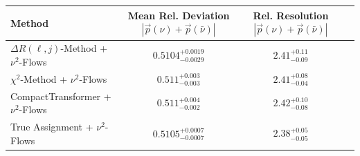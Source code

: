     \begin{tabular}{lccc}
        \toprule
        Method & Mean Rel. Deviation $|\vec{p}(\nu) + \vec{p}(\bar{\nu})|$ & Rel. Resolution $|\vec{p}(\nu) + \vec{p}(\bar{\nu})|$ \\
        \midrule
        $\Delta R(\ell,j)$-Method + $\nu^2$-Flows & $0.5104^{+0.0019}_{-0.0029}$ & $2.41^{+0.11}_{-0.09}$ \\
        $\chi^2$-Method + $\nu^2$-Flows & $0.511^{+0.003}_{-0.003}$ & $2.41^{+0.08}_{-0.04}$ \\
        CompactTransformer + $\nu^2$-Flows & $0.511^{+0.004}_{-0.002}$ & $2.42^{+0.10}_{-0.08}$ \\
        True Assignment + $\nu^2$-Flows & $0.5105^{+0.0007}_{-0.0007}$ & $2.38^{+0.05}_{-0.05}$ \\
        \bottomrule
    \end{tabular}